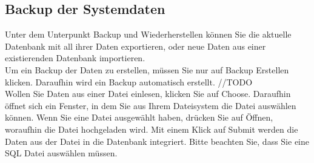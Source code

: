 \documentclass[enabledeprecatedfontcommands,fontsize=12pt,paper=a4,twoside]{scrartcl}
\begin{document}
\subsection{Backup der Systemdaten}
Unter dem Unterpunkt Backup und Wiederherstellen können Sie die aktuelle Datenbank mit all ihrer Daten exportieren, oder neue Daten aus einer existierenden Datenbank importieren. \\

Um ein Backup der Daten zu erstellen, müssen Sie nur auf Backup Erstellen klicken. Daraufhin wird ein Backup automatisch erstellt. //TODO \\

Wollen Sie Daten aus einer Datei einlesen, klicken Sie auf Choose. Daraufhin öffnet sich ein Fenster, in dem Sie aus Ihrem Dateisystem die Datei auswählen können. Wenn Sie eine Datei ausgewählt haben, drücken Sie auf Öffnen, woraufhin die Datei hochgeladen wird. Mit einem Klick auf Submit werden die Daten aus der Datei in die Datenbank integriert. Bitte beachten Sie, dass  Sie eine SQL Datei auswählen müssen. \\ 
\end{document}
